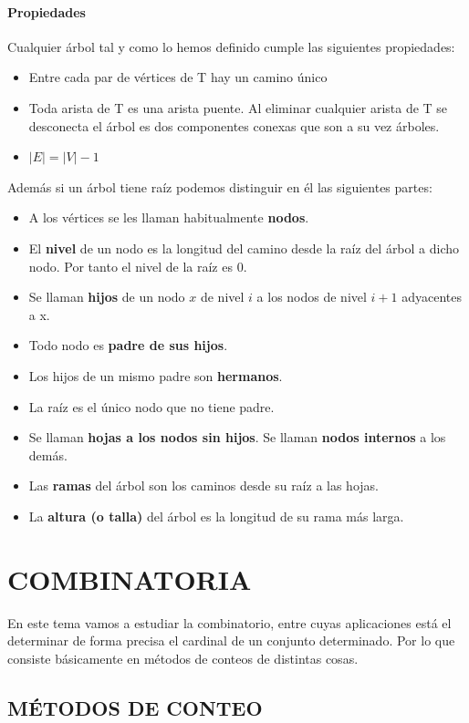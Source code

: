 \documentclass[10pt,a4paper,openright]{book}
\begin{document}
\subsubsection*{Propiedades}
Cualquier árbol tal y como lo hemos definido cumple las siguientes propiedades:
\begin{itemize}
\item Entre cada par de vértices de T hay un camino único
\item Toda arista de T es una arista puente. Al eliminar 
cualquier arista de T se desconecta el árbol es dos 
componentes conexas que son a su vez árboles.
\item $|E| = |V| - 1$
\end{itemize}

Además si un árbol tiene raíz podemos distinguir en él las siguientes partes:
\begin{itemize}
\item A los vértices se les llaman habitualmente \textbf{nodos}. 
\item El \textbf{nivel} de un nodo es la longitud del camino desde la raíz del árbol a dicho nodo. Por tanto el nivel de la raíz es 0.
\item Se llaman \textbf{hijos} de un nodo $x$ de nivel $i$ a los nodos de nivel $i + 1$ adyacentes a x.
\item Todo nodo es \textbf{padre de sus hijos}.
\item Los hijos de un mismo padre son \textbf{hermanos}.
\item La raíz es el único nodo que no tiene padre.
\item Se llaman \textbf{hojas a los nodos sin hijos}. Se llaman \textbf{nodos internos} a los demás.
\item Las \textbf{ramas} del árbol son los caminos desde su raíz a las hojas.
\item La \textbf{altura (o talla)} del árbol es la longitud de su rama más larga.
\end{itemize}

\chapter*{COMBINATORIA}
En este tema vamos a estudiar la combinatorio, entre cuyas aplicaciones está el determinar de forma precisa el cardinal de un conjunto determinado. Por lo que consiste básicamente en métodos de conteos de distintas cosas.

\section*{MÉTODOS DE CONTEO}
\end{document}
